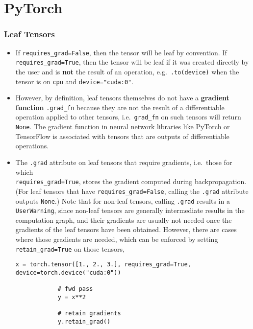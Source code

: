 \documentclass[12pt, a4paper]{scrbook}
\numberwithin{equation}{section}
\theoremstyle{definition}
\theoremstyle{definition}
\begin{document}
	\section{PyTorch}
	
	\subsubsection{Leaf Tensors}
	
	\begin{itemize}
		\item If \texttt{requires\_grad=False}, then the tensor will be leaf by convention. If \texttt{requires\_grad=True}, then the tensor will be leaf if it was created directly by the user and is \textbf{not} the result of an operation, e.g.~\texttt{.to(device)} when the tensor is on \texttt{cpu} and \texttt{device="cuda:0"}.
		
		\item However, by definition, leaf tensors themselves do not have a \textbf{gradient function} \texttt{.grad\_fn} \mbox{because} they are not the result of a differentiable operation applied to other tensors, i.e.~\texttt{grad\_fn} on such tensors will return \texttt{None}. The gradient function in neural network libraries like PyTorch or TensorFlow is associated with tensors that are outputs of differentiable operations.
		
		\item The \texttt{.grad} attribute on leaf tensors that require gradients, i.e.~those for which \\ \texttt{requires\_grad=True}, stores the gradient computed during backpropagation. (For leaf tensors that have \texttt{requires\_grad=False}, calling the \texttt{.grad} attribute outputs \texttt{None}.) Note that for non-leaf tensors, calling \texttt{.grad} results in a \texttt{UserWarning}, since non-leaf tensors are generally intermediate results in the computation graph, and their gradients are usually not needed once the gradients of the leaf tensors have been obtained. However, there are cases where those gradients are needed, which can be enforced by setting \texttt{retain\_grad=True} on those tensors,
		
		\begin{lstlisting}[style=mystylepython, label=alg:retain_grad, xleftmargin=\parindent]
			x = torch.tensor([1., 2., 3.], requires_grad=True, device=torch.device("cuda:0"))
			
			# fwd pass
			y = x**2
			
			# retain gradients
			y.retain_grad()
			

\end{lstlisting}
\end{itemize}
\end{document}

